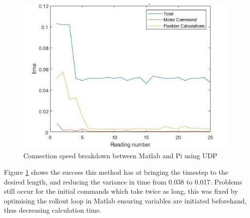 \documentclass[twoside,twocolumn,12pt]{article}
\begin{document}
\begin{figure}
  \centering
    \includegraphics[width=\linewidth]{50ms_udp}
  \caption{Connection speed breakdown between Matlab and Pi using UDP}
  \label{fig:piudp}
\end{figure} 

Figure \ref{fig:piudp} shows the success this method has at bringing the timestep to the desired length, and reducing the variance in time from 0.038 to 0.017.  Problems still occur for the initial commands which take twice as long, this was fixed by optimising the rollout loop in Matlab ensuring variables are initiated beforehand, thus decreasing calculation time.  

\onecolumn
\end{document}

